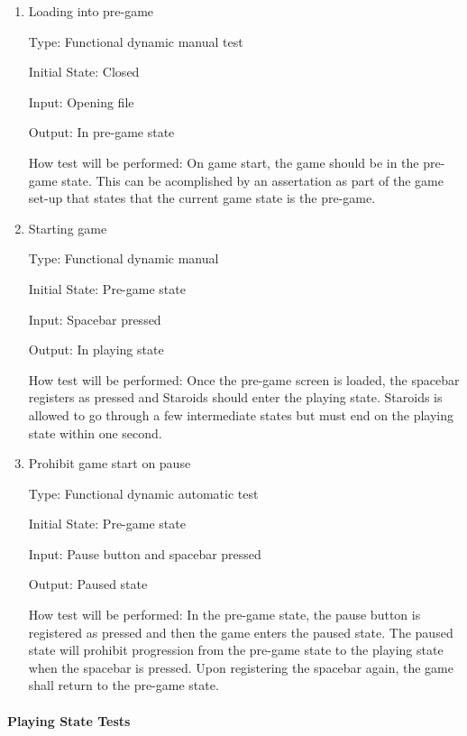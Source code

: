 \documentclass[12pt, titlepage]{article}
\begin{document}
\begin{enumerate}

\item{Loading into pre-game\\}

Type: Functional dynamic manual test

Initial State: Closed

Input: Opening file

Output: In pre-game state

How test will be performed: On game start, the game should be in the pre-game state. This can be acomplished by an assertation as part of the game set-up that states that the current game state is the pre-game.

\item{Starting game\\}

Type: Functional dynamic manual

Initial State: Pre-game state

Input: Spacebar pressed

Output: In playing state

How test will be performed: Once the pre-game screen is loaded, the spacebar registers as pressed and Staroids should enter the playing state. Staroids is allowed to go through a few intermediate states but must end on the playing state within one second.

\item{Prohibit game start on pause\\}

Type: Functional dynamic automatic test

Initial State: Pre-game state

Input: Pause button and spacebar pressed

Output: Paused state

How test will be performed: In the pre-game state, the pause button is registered as pressed and then the game enters the paused state. The paused state will prohibit progression from the pre-game state to the playing state when the spacebar is pressed. Upon registering the spacebar again, the game shall return to the pre-game state.

\end{enumerate}

\paragraph{Playing State Tests}
\end{document}
